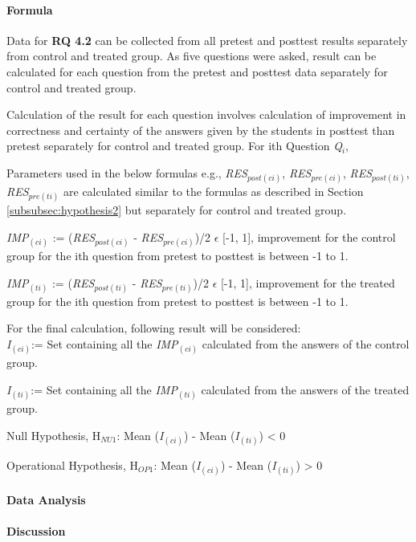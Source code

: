 \paragraph{Formula}
Data for \textbf{RQ 4.2} can be collected from all pretest and posttest results separately from control and treated group. As five questions were asked, result can be calculated for each question from the pretest and posttest data separately for control and treated group. 

Calculation of the result for each question involves calculation of improvement in correctness and certainty of the answers given by the students in posttest than pretest separately for control and treated group.
For ith Question \textit{Q$_{i}$},

Parameters used in the below formulas e.g., \textit{RES$_{post(ci)}$}, \textit{RES$_{pre(ci)}$}, \textit{RES$_{post(ti)}$}, \textit{RES$_{pre(ti)}$} are calculated similar to the formulas as described in Section \ref{subsubsec:hypothesis2} but separately for control and treated group.

\textit{IMP$_{(ci)}$} := (\textit{RES$_{post(ci)}$} - \textit{RES$_{pre(ci)}$})/2 $\epsilon$ [-1,  1], improvement for the control group for the ith question from pretest to posttest is between -1 to 1.

\textit{IMP$_{(ti)}$} := (\textit{RES$_{post(ti)}$} - \textit{RES$_{pre(ti)}$})/2 $\epsilon$ [-1,  1], improvement for the treated group for the ith question from pretest to posttest is between -1 to 1.

For the final calculation, following result will be considered:\\
\textit{I$_{(ci)}$}:= Set containing all the \textit{IMP$_{(ci)}$} calculated from the answers of the control group.

\textit{I$_{(ti)}$}:= Set containing all the \textit{IMP$_{(ti)}$} calculated from the answers of the treated group.

Null Hypothesis, {H$_{NU1}$}: Mean (\textit{I$_{(ci)}$})  - Mean (\textit{I$_{(ti)}$}) < 0

Operational Hypothesis, {H$_{OP1}$}: Mean (\textit{I$_{(ci)}$})  - Mean (\textit{I$_{(ti)}$}) > 0


\paragraph{Data Analysis}
\paragraph{Discussion}